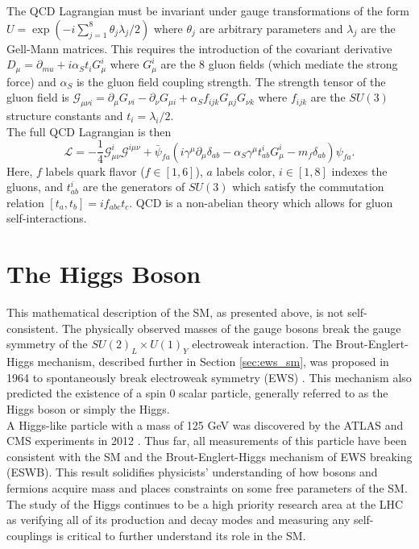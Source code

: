 The QCD Lagrangian must be invariant under gauge transformations of the form $U=\exp(-i\sum_{j=1}^8{\theta_j\lambda_j/2})$ where $\theta_j$ are arbitrary parameters and $\lambda_j$ are the Gell-Mann matrices. This requires the introduction of the covariant derivative $D_{\mu}=\partial_{mu}+ i\alpha_S t_i G_{\mu}^i$ where $G_{\mu}^i$ are the 8 gluon fields (which mediate the strong force) and $\alpha_S$ is the gluon field coupling strength. The strength tensor of the gluon field is $\mathcal{G}_{\mu\nu i}=\partial_{\mu}G_{\nu i}-\partial_{\nu}G_{\mu i}+\alpha_S f_{ijk}G_{\mu j}G_{\nu k}$ where $f_{ijk}$ are the $SU(3)$ structure constants and $t_i=\lambda_i/2$.\\ 

The full QCD Lagrangian is then
$$
\mathcal{L}=-\frac{1}{4}\mathcal{G}^i_{\mu\nu}\mathcal{G}^{i\mu\nu}+\bar{\psi}_{fa}(i\gamma^{\mu}\partial_{\mu}\delta_{ab}-\alpha_S\gamma^{\mu}t^i_{ab}G^i_{\mu}-m_f\delta_{ab})\psi_{fa}.
$$
Here, $f$ labels quark flavor ($f\in[1,6]$), $a$ labels color, $i\in[1,8]$ indexes the gluons, and $t^i_{ab}$ are the generators of $SU(3)$ which satisfy the commutation relation $[t_a,t_b]=if_{abc}t_c$. QCD is a non-abelian theory which allows for gluon self-interactions.\\

\section{The Higgs Boson}\label{sec:higgs}
This mathematical description of the SM, as presented above, is not self-consistent. The physically observed masses of the gauge bosons break the gauge symmetry of the $SU(2)_L \times U(1)_Y$ electroweak interaction. The Brout-Englert-Higgs mechanism, described further in Section \ref{sec:ews_sm}, was proposed in 1964 to spontaneously break electroweak symmetry (EWS) \cite{higgs_higgs} \cite{higgs_brout} \cite{higgs_guralnik}. This mechanism also predicted the existence of a spin 0 scalar particle, generally referred to as the Higgs boson or simply the Higgs.\\

A Higgs-like particle with a mass of 125 GeV was discovered by the ATLAS and CMS experiments in 2012 \cite{higgs_disc_atlas} \cite{higgs_disc_cms}. Thus far, all measurements of this particle have been consistent with the SM and the Brout-Englert-Higgs mechanism of EWS breaking (ESWB). This result solidifies physicists' understanding of how bosons and fermions acquire mass and places constraints on some free parameters of the SM. The study of the Higgs continues to be a high priority research area at the LHC as verifying all of its production and decay modes and measuring any self-couplings is critical to further understand its role in the SM.

